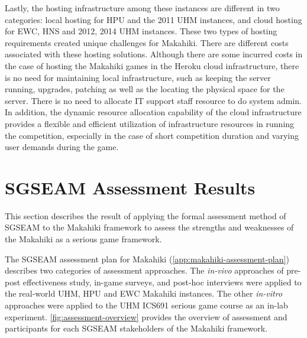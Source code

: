 Lastly, the hosting infrastructure among these instances are different in two categories: local hosting for HPU and the 2011 UHM instances, and cloud hosting for EWC, HNS and 2012, 2014 UHM instances. These two types of hosting requirements created unique challenges for Makahiki. There are different costs associated with these hosting solutions. Although there are some incurred costs in the case of hosting the Makahiki games in the Heroku cloud infrastructure, there is no need for maintaining local infrastructure, such as keeping the server running, upgrades, patching as well as the locating the physical space for the server. There is no need to allocate IT support staff resource to do system admin. In addition, the dynamic resource allocation capability of the cloud infrastructure provides a flexible and efficient utilization of infrastructure resources in running the competition, especially in the case of short competition duration and varying user demands during the game.

\section{SGSEAM Assessment Results}
\label{sec:assessment-result}

This section describes the result of applying the formal assessment method of SGSEAM to the Makahiki framework to assess the strengths and weaknesses of the Makahiki as a serious game framework.

The SGSEAM assessment plan for Makahiki (\autoref{app:makahiki-assessment-plan}) describes two categories of assessment approaches. The {\em in-vivo} approaches of pre-post effectiveness study, in-game surveys, and post-hoc interviews were applied to the real-world UHM, HPU and EWC Makahiki instances. The other {\em in-vitro} approaches were applied to the UHM ICS691 serious game course as an in-lab experiment.  \autoref{fig:assessment-overview} provides the overview of assessment and participants for each SGSEAM stakeholders of the Makahiki framework. 

